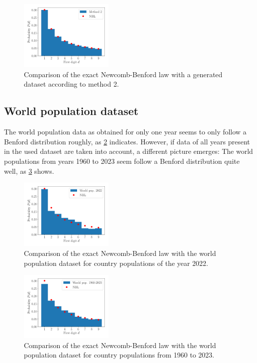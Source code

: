 \documentclass[a4paper,10pt, twocolumn]{article}
\begin{document}
\begin{figure}[h]
	\centering
	\includegraphics[width=0.4\textwidth]{figures/gen_method_2.pdf}
	\caption{Comparison of the exact Newcomb-Benford law with a generated dataset according to method 2.}
	\label{fig:gen_method_2}
\end{figure}

\subsection{World population dataset}
The world population data as obtained for only one year seems to only follow a Benford distribution roughly, as \cref{fig:pop_2022} indicates. However, if data of all years present in the used dataset are taken into account, a different picture emerges: The world populations from years 1960 to 2023 seem follow a Benford distribution quite well, as \cref{fig:pop_1960_2023} shows.

\begin{figure}[h]
	\centering
	\includegraphics[width=0.4\textwidth]{figures/pop_2022.pdf}
	\caption{Comparison of the exact Newcomb-Benford law with the world population dataset for country populations of the year 2022.}
	\label{fig:pop_2022}
\end{figure}

\begin{figure}[h]
	\centering
	\includegraphics[width=0.4\textwidth]{figures/pop_1960_2023.pdf}
	\caption{Comparison of the exact Newcomb-Benford law with the world population dataset for country populations from 1960 to 2023.}
	\label{fig:pop_1960_2023}
\end{figure}
\end{document}
